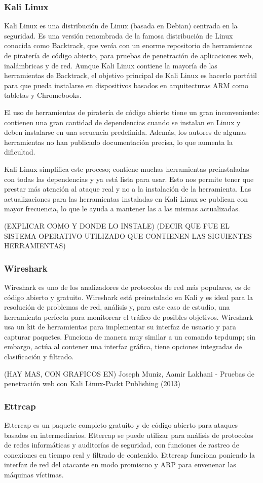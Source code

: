 
\subsubsection*{Kali Linux}
Kali Linux es una distribución de Linux (basada en Debian) centrada en la seguridad. 
Es una versión renombrada de la famosa distribución de Linux conocida como Backtrack, 
que venía con un enorme repositorio de herramientas de piratería de código abierto, 
para pruebas de penetración de aplicaciones web, inalámbricas y de red. Aunque Kali 
Linux contiene la mayoría de las herramientas de Backtrack, el objetivo principal 
de Kali Linux es hacerlo portátil para que pueda instalarse en dispositivos basados 
en arquitecturas ARM como tabletas y Chromebooks.

El uso de herramientas de piratería de código abierto tiene un gran inconveniente: 
contienen una gran cantidad de dependencias cuando se instalan en Linux y deben 
instalarse en una secuencia predefinida. Además, los autores de algunas herramientas 
no han publicado documentación precisa, lo que aumenta la dificultad.

Kali Linux simplifica este proceso; contiene muchas herramientas preinstaladas con 
todas las dependencias y ya está lista para usar. Esto nos permite tener que prestar 
más atención al ataque real y no a la instalación de la herramienta. Las actualizaciones 
para las herramientas instaladas en Kali Linux se publican con mayor frecuencia, 
lo que le ayuda a mantener las a las mismas actualizadas.


(EXPLICAR COMO Y DONDE LO INSTALE)
(DECIR QUE FUE EL SISTEMA OPERATIVO UTILIZADO QUE CONTIENEN LAS SIGUIENTES HERRAMIENTAS)
\subsubsection*{Wireshark}
Wireshark es uno de los analizadores de protocolos de red más populares, es de 
código abierto y gratuito. Wireshark está preinstalado en Kali y es ideal para la 
resolución de problemas de red, análisis y, para este caso de estudio, una herramienta 
perfecta para monitorear el tráfico de posibles objetivos. Wireshark usa un kit de 
herramientas para implementar su interfaz de usuario y para capturar paquetes. 
Funciona de manera muy similar a un comando tcpdump; sin embargo, actúa al contener 
una interfaz gráfica, tiene opciones integradas de clasificación y filtrado.

(HAY MAS, CON GRAFICOS EN)
Joseph Muniz, Aamir Lakhani - Pruebas de penetración web con Kali Linux-Packt Publishing (2013) 

\subsubsection*{Ettrcap}

Ettercap es un paquete completo gratuito y de código abierto para ataques basados 
en intermediarios. Ettercap se puede utilizar para análisis de protocolos de redes 
informáticas y auditorías de seguridad, con funciones de rastreo de conexiones en 
tiempo real y filtrado de contenido. Ettercap funciona poniendo la interfaz de red 
del atacante en modo promiscuo y ARP para envenenar las máquinas víctimas.

